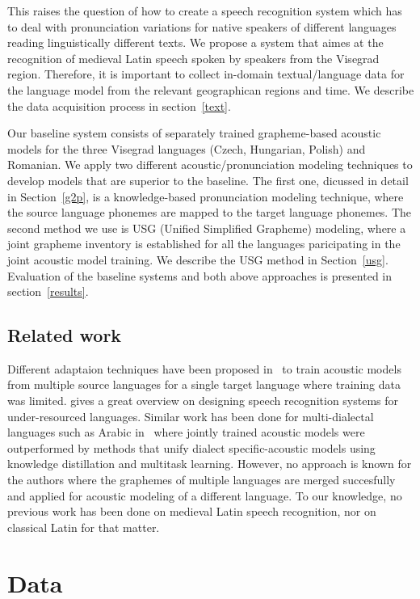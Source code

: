 \documentclass[runningheads,a4paper]{llncs}
\begin{document}
This raises the question of how to create a speech recognition system which has to deal with pronunciation variations for native speakers of different languages reading linguistically different texts.
We propose a system that aimes at the recognition of medieval Latin speech spoken by speakers from the Visegrad region.
Therefore, it is important to collect in-domain textual/language data for the language model from the relevant geographican regions and time.
We describe the data acquisition process in section~\ref{text}.

Our baseline system consists of separately trained grapheme-based acoustic models for the three Visegrad languages (Czech, Hungarian, Polish) and Romanian.
We apply two different acoustic/pronunciation modeling techniques to develop models that are superior to the baseline.
The first one, dicussed in detail in Section~\ref{g2p}, is a knowledge-based pronunciation modeling technique, where the source language phonemes are mapped to the target language phonemes.
The second method we use is USG (Unified Simplified Grapheme) modeling, where a joint grapheme inventory is established for all the languages paricipating in the joint acoustic model training.
We describe the USG method in Section~\ref{usg}.
Evaluation of the baseline systems and both above approaches is presented in section~\ref{results}.

\subsection{Related work}
Different adaptaion techniques have been proposed in~\cite{schultz01} to train acoustic models from multiple source languages for a single target language where training data was limited.
\cite{besacier14} gives a great overview on designing speech recognition systems for under-resourced languages.
Similar work has been done for multi-dialectal languages such as Arabic in~\cite{elfeky16} where jointly trained acoustic models were outperformed by methods that unify dialect specific-acoustic models using knowledge distillation and multitask learning.
However, no  approach is known for the authors where the graphemes of multiple languages are merged succesfully and applied for acoustic modeling of a different language.
To our knowledge, no previous work has been done on medieval Latin speech recognition, nor on classical Latin for that matter.

\section{Data}
\end{document}
